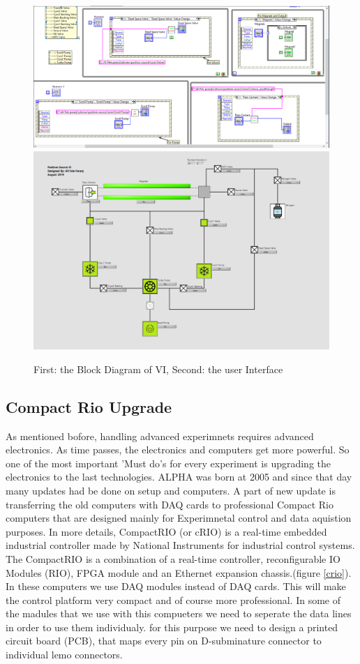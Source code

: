 \documentclass[12pt,a4paper]{article}
\begin{document}
\begin{figure}[h]
\centering
\includegraphics[scale=0.29]{Block-Diagram}
\includegraphics[scale=0.22]{InterFace}
\caption{First: the Block Diagram of VI, Second: the user Interface}
\label{VI}
\end{figure}

\subsection{Compact Rio Upgrade}
As mentioned bofore, handling advanced experimnets requires advanced electronics. As time passes, the electronics and computers get more powerful. So one of the most important 'Must do's for every experiment is upgrading the electronics to the last technologies. ALPHA was born at 2005 and since that day many updates had be done on setup and computers. A part of new update is transferring the old computers with DAQ cards to professional Compact Rio computers that are designed mainly for Experimnetal control and data aquistion purposes. In more details, CompactRIO (or cRIO) is a real-time embedded industrial controller made by National Instruments for industrial control systems. The CompactRIO is a combination of a real-time controller, reconfigurable IO Modules (RIO), FPGA module and an Ethernet expansion chassis.(figure \ref{crio}). In these computers we use DAQ modules instead of DAQ cards. This will make the control platform very compact and of course more professional. In some of the madules that we use with this compueters we need to seperate the data lines in order to use them individualy. for this purpose we need to design a printed circuit board (PCB), that maps every pin on D-subminature connector to individual lemo connectors.
\end{document}

